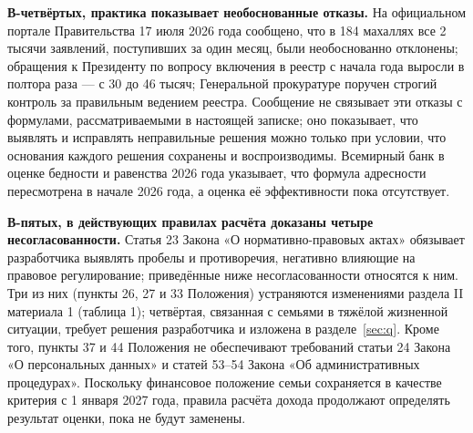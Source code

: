 \documentclass[14pt,a4paper]{extarticle}
\begin{document}
\textbf{В-четвёртых, практика показывает необоснованные отказы.} На официальном портале Правительства 17 июля 2026 года сообщено, что в 184 махаллях все 2 тысячи заявлений, поступивших за один месяц, были необоснованно отклонены; обращения к Президенту по вопросу включения в реестр с начала года выросли в полтора раза — с 30 до 46 тысяч; Генеральной прокуратуре поручен строгий контроль за правильным ведением реестра\cite{govuz}. Сообщение не связывает эти отказы с формулами, рассматриваемыми в настоящей записке; оно показывает, что выявлять и исправлять неправильные решения можно только при условии, что основания каждого решения сохранены и воспроизводимы. Всемирный банк в оценке бедности и равенства 2026 года указывает, что формула адресности пересмотрена в начале 2026 года, а оценка её эффективности пока отсутствует\cite{wb2026}.

\textbf{В-пятых, в действующих правилах расчёта доказаны четыре несогласованности.} Статья 23 Закона «О нормативно-правовых актах» обязывает разработчика выявлять пробелы и противоречия, негативно влияющие на правовое регулирование\cite{orq682}; приведённые ниже несогласованности относятся к ним. Три из них (пункты 26, 27 и 33 Положения) устраняются изменениями раздела II материала 1 (таблица 1); четвёртая, связанная с семьями в тяжёлой жизненной ситуации, требует решения разработчика и изложена в разделе~\ref{sec:q}. Кроме того, пункты 37 и 44 Положения не обеспечивают требований статьи 24 Закона «О персональных данных» и статей 53–54 Закона «Об административных процедурах». Поскольку финансовое положение семьи сохраняется в качестве критерия с 1 января 2027 года, правила расчёта дохода продолжают определять результат оценки, пока не будут заменены.
\end{document}
